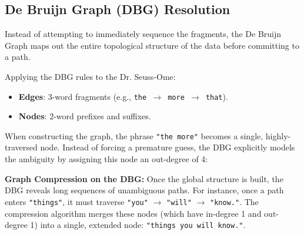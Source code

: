 \subsection{De Bruijn Graph (DBG) Resolution}
Instead of attempting to immediately sequence the fragments, the De Bruijn Graph maps out the entire topological structure of the data before committing to a path.

Applying the DBG rules to the Dr. Seuss-Ome:
\begin{itemize}
    \item \textbf{Edges}: 3-word fragments (e.g., \texttt{the $\rightarrow$ more $\rightarrow$ that}).
    \item \textbf{Nodes}: 2-word prefixes and suffixes.
\end{itemize}

When constructing the graph, the phrase \texttt{"the more"} becomes a single, highly-traversed node. Instead of forcing a premature guess, the DBG explicitly models the ambiguity by assigning this node an out-degree of 4:

\begin{center}
\end{center}

\textbf{Graph Compression on the DBG:}
Once the global structure is built, the DBG reveals long sequences of unambiguous paths. For instance, once a path enters \texttt{"things"}, it must traverse \texttt{"you"} $\rightarrow$ \texttt{"will"} $\rightarrow$ \texttt{"know."}. 
The compression algorithm merges these nodes (which have in-degree 1 and out-degree 1) into a single, extended node: \texttt{"things you will know."}. 

